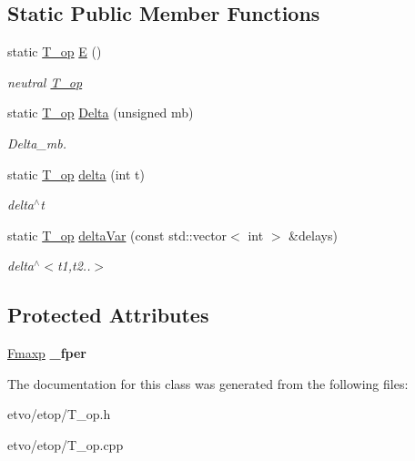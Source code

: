 \subsection*{Static Public Member Functions}
\begin{DoxyCompactItemize}
\item 
\mbox{\label{classetvo_i_i_1_1_t__op_ae07676762447f306429a5cee4057dd2e}} 
static \mbox{\hyperlink{classetvo_i_i_1_1_t__op}{T\+\_\+op}} \mbox{\hyperlink{classetvo_i_i_1_1_t__op_ae07676762447f306429a5cee4057dd2e}{E}} ()
\begin{DoxyCompactList}\small\item\em neutral \mbox{\hyperlink{classetvo_i_i_1_1_t__op}{T\+\_\+op}} \end{DoxyCompactList}\item 
\mbox{\label{classetvo_i_i_1_1_t__op_aebfcd131e3715e02e82dc3da9499e5b1}} 
static \mbox{\hyperlink{classetvo_i_i_1_1_t__op}{T\+\_\+op}} \mbox{\hyperlink{classetvo_i_i_1_1_t__op_aebfcd131e3715e02e82dc3da9499e5b1}{Delta}} (unsigned mb)
\begin{DoxyCompactList}\small\item\em Delta\+\_\+mb. \end{DoxyCompactList}\item 
\mbox{\label{classetvo_i_i_1_1_t__op_ad78351eb96e65281f8bc96b09788f18a}} 
static \mbox{\hyperlink{classetvo_i_i_1_1_t__op}{T\+\_\+op}} \mbox{\hyperlink{classetvo_i_i_1_1_t__op_ad78351eb96e65281f8bc96b09788f18a}{delta}} (int t)
\begin{DoxyCompactList}\small\item\em delta$^\wedge$t \end{DoxyCompactList}\item 
\mbox{\label{classetvo_i_i_1_1_t__op_aa0e83781b7a2023c99b80e6c37bda384}} 
static \mbox{\hyperlink{classetvo_i_i_1_1_t__op}{T\+\_\+op}} \mbox{\hyperlink{classetvo_i_i_1_1_t__op_aa0e83781b7a2023c99b80e6c37bda384}{delta\+Var}} (const std\+::vector$<$ int $>$ \&delays)
\begin{DoxyCompactList}\small\item\em delta$^\wedge$$<$t1,t2..$>$ \end{DoxyCompactList}\end{DoxyCompactItemize}
\subsection*{Protected Attributes}
\begin{DoxyCompactItemize}
\item 
\mbox{\label{classetvo_i_i_1_1_t__op_a1c7941be85342bad8476cf4be8fce3c5}} 
\mbox{\hyperlink{classetvo_i_i_1_1_fmaxp}{Fmaxp}} {\bfseries \+\_\+fper}
\end{DoxyCompactItemize}


The documentation for this class was generated from the following files\+:\begin{DoxyCompactItemize}
\item 
etvo/etop/T\+\_\+op.\+h\item 
etvo/etop/T\+\_\+op.\+cpp\end{DoxyCompactItemize}
